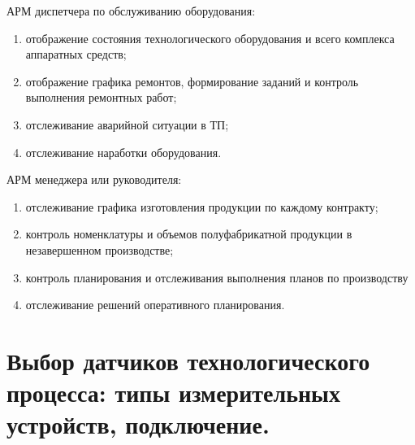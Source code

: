 \documentclass[unicode, 12pt, a4paper, oneside]{article}
\begin{document}
АРМ диспетчера по обслуживанию оборудования:
\begin{enumerate}
\item	отображение состояния технологического оборудования и всего комплекса аппаратных средств;
\item	отображение графика ремонтов, формирование заданий и контроль выполнения ремонтных работ;
\item	отслеживание аварийной ситуации в ТП;
\item	отслеживание наработки оборудования.
\end{enumerate}
АРМ менеджера или руководителя:
\begin{enumerate}
\item отслеживание графика изготовления продукции по каждому контракту;
\item	контроль номенклатуры и объемов полуфабрикатной продукции в незавершенном производстве;
\item	контроль планирования и отслеживания выполнения планов по производству
\item	отслеживание решений оперативного планирования.
\end{enumerate}


\section{Выбор датчиков технологического процесса: типы измерительных устройств,  подключение.}
\end{document}
